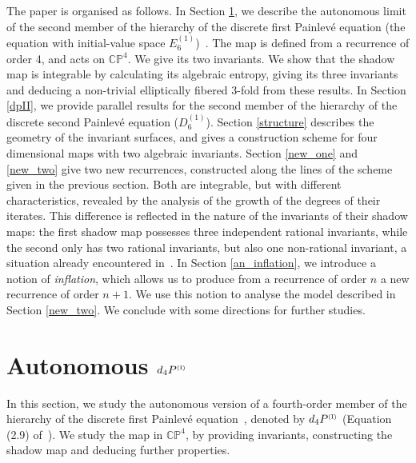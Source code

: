 \documentclass[reqno]{amsart}
\numberwithin{equation}{section}
\numberwithin{figure}{section}
\begin{document}
The paper is organised as follows. In Section \ref{dpI}, we describe
the autonomous limit of the second member of the hierarchy of the
discrete first Painlev\'e equation (the equation with initial-value
space $E_6^{(1)}$)~\cite{CrJo99}.  The map is defined from a
recurrence of order 4, and acts on $\mathbb C\mathbb P^4$. We give its
two invariants.  We show that the shadow map is integrable by
calculating its algebraic entropy, giving its three invariants and
deducing a non-trivial elliptically fibered 3-fold from these
results. In Section \ref{dpII}, we provide parallel results for the
second member of the hierarchy of the discrete second Painlev\'e
equation ($D_6^{(1)}$).  Section \ref{structure} describes the
geometry of the invariant surfaces, and gives a construction scheme
for four dimensional maps with two algebraic invariants. Section
\ref{new_one} and \ref{new_two} give two new recurrences, constructed
along the lines of the scheme given in the previous section.  Both are
integrable, but with different characteristics, revealed by the
analysis of the growth of the degrees of their iterates. This
difference is reflected in the nature of the invariants of their
shadow maps: the first shadow map possesses three independent rational
invariants, while the second only has two rational invariants, but
also one non-rational invariant, a situation already encountered
in~\cite{AnMaVi02b}. In Section \ref{an_inflation}, we introduce a
notion of {\em inflation}, which allows us to produce from a
recurrence of order $n$ a new recurrence of order $n+1$. We use this
notion to analyse the model described in Section \ref{new_two}. We
conclude with some directions for further studies.
\bigskip

\section{Autonomous $d_4P^{\scriptscriptstyle (\rm I) }$}
\label{dpI}

In this section, we study the autonomous version of a fourth-order
member of the hierarchy of the discrete first Painlev\'e
equation~\cite{CrJo99}, denoted by $d_4P^{\scriptscriptstyle (\rm I)
}$ (Equation (2.9) of~\cite{CrJo99}). We study the map in $\mathbb C \mathbb
P^4$, by providing invariants, constructing the shadow map and
deducing further properties.
\end{document}
